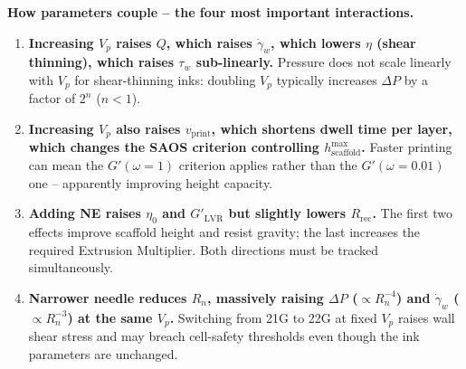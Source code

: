 \documentclass[11pt,a4paper]{article}
\newcommand{\gd}{\dot{\gamma}}
\begin{document}
\begin{interactionbox}
\textbf{How parameters couple -- the four most important interactions.}
\begin{enumerate}[leftmargin=1.6em,itemsep=3pt]
\item \textbf{Increasing $V_p$ raises $Q$, which raises $\gd_w$, which
lowers $\eta$ (shear thinning), which raises $\tau_w$ sub-linearly.}
Pressure does not scale linearly with $V_p$ for shear-thinning inks:
doubling $V_p$ typically increases $\Delta P$ by a factor of
$2^n$ ($n<1$).
\item \textbf{Increasing $V_p$ also raises $v_\mathrm{print}$, which
shortens dwell time per layer, which changes the SAOS criterion
controlling $h_\mathrm{scaffold}^\mathrm{max}$.} Faster printing can
mean the $G'(\omega=1)$ criterion applies rather than the
$G'(\omega=0.01)$ one -- apparently improving height capacity.
\item \textbf{Adding NE raises $\eta_0$ and $G'_\mathrm{LVR}$ but
slightly lowers $R_\mathrm{rec}$.} The first two effects improve
scaffold height and resist gravity; the last increases the required
Extrusion Multiplier. Both directions must be tracked simultaneously.
\item \textbf{Narrower needle reduces $R_n$, massively raising $\Delta P$
($\propto R_n^{-4}$) and $\gd_w$ ($\propto R_n^{-3}$) at the same
$V_p$.} Switching from 21G to 22G at fixed $V_p$ raises wall shear
stress and may breach cell-safety thresholds even though the ink
parameters are unchanged.
\end{enumerate}
\end{interactionbox}
\end{document}
